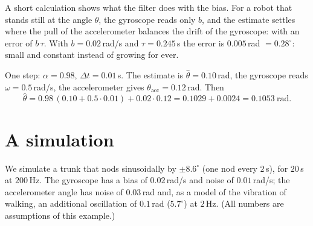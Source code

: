 \begin{center}
\end{center}

A short calculation shows what the filter does with the bias. For a robot that stands still at the angle $\theta$, the gyroscope reads only $b$, and the estimate settles where the pull of the accelerometer balances the drift of the gyroscope: with an error of $b\,\tau$. With $b=0.02$\,rad/s and $\tau=0.245$\,s the error is $0.005$\,rad $=0.28^{\circ}$: small and constant instead of growing for ever.

\begin{example}
One step: $\alpha=0.98$, $\Delta t=0.01$\,s. The estimate is $\hat\theta=0.10$\,rad, the gyroscope reads $\omega=0.5$\,rad/s, the accelerometer gives $\theta_{\text{acc}}=0.12$\,rad. Then
\[
\hat\theta=0.98\,(0.10+0.5\cdot0.01)+0.02\cdot0.12=0.1029+0.0024=0.1053\ \text{rad}.
\]
\end{example}

\section*{A simulation}
We simulate a trunk that nods sinusoidally by $\pm8.6^{\circ}$ (one nod every $2$\,s), for $20$\,s at $200$\,Hz. The gyroscope has a bias of $0.02$\,rad/s and noise of $0.01$\,rad/s; the accelerometer angle has noise of $0.03$\,rad and, as a model of the vibration of walking, an additional oscillation of $0.1$\,rad ($5.7^{\circ}$) at $2$\,Hz. (All numbers are assumptions of this example.)

